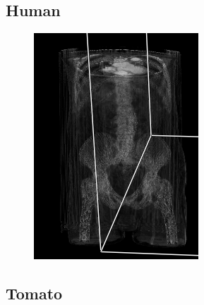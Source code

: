 \documentclass[a4paper,twoside,11pt]{article}
\begin{document}
 \subsection{Human}
 \begin{figure}[H]
 \centering
 \includegraphics{images/bodyOp2}
 \caption{}
 \label{bodyOp}
 \end{figure}
 
 \subsection{Tomato}
 
\end{document}
